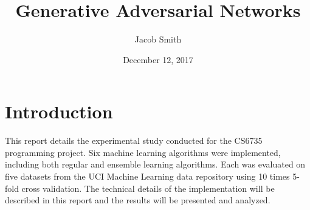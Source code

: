 \documentclass[11pt]{article}
\title{Generative Adversarial Networks}
\author{Jacob Smith}
\date{December 12, 2017}
\begin{document}
\maketitle

\section{Introduction}
This report details the experimental study conducted for the CS6735 programming project. Six machine learning algorithms were implemented, including both regular and ensemble learning algorithms. Each was evaluated on five datasets from the UCI Machine Learning data repository using 10 times 5-fold cross validation. The technical details of the implementation will be described in this report and the results will be presented and analyzed.
\end{document}
